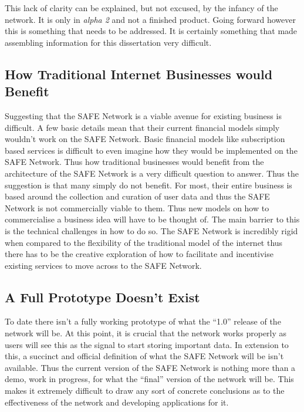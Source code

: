 This lack of clarity can be explained, but not excused, by the infancy of the network. It is only in \textit{alpha 2} and not a finished product. Going forward however this is something that needs to be addressed. It is certainly something that made assembling information for this dissertation very difficult.

\subsection{How Traditional Internet Businesses would Benefit}

Suggesting that the SAFE Network is a viable avenue for existing business is difficult. A few basic details mean that their current financial models simply wouldn't work on the SAFE Network. Basic financial models like subscription based services is difficult to even imagine how they would be implemented on the SAFE Network. Thus how traditional businesses  would benefit from the architecture of the SAFE Network is a very difficult question to answer. Thus the suggestion is that many simply do not benefit. For most, their entire business is based around the collection and curation of user data and thus the SAFE Network is not commercially viable to them. Thus new models on how to commercialise a business idea will have to be thought of. The main barrier to this is the technical challenges in how to do so. The SAFE Network is incredibly rigid when compared to the flexibility of the traditional model of the internet thus there has to be the creative exploration of how to facilitate and incentivise existing services to move across to the SAFE Network.

\subsection{A Full Prototype Doesn't Exist}

To date there isn't a fully working prototype of what the ``1.0'' release of the network will be. At this point, it is crucial that the network works properly as users will see this as the signal to start storing important data. In extension to this, a succinct and official definition of what the SAFE Network will be isn't available. Thus the current version of the SAFE Network is nothing more than a demo, work in progress, for what the ``final'' version of the network will be. This makes it extremely difficult to draw any sort of concrete conclusions as to the effectiveness of the network and developing applications for it.

